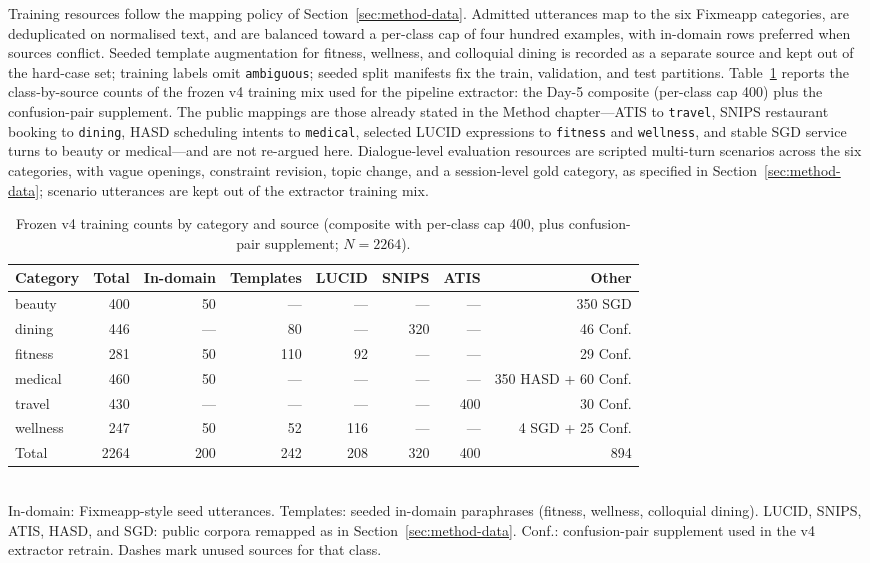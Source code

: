 Training resources follow the mapping policy of Section~\ref{sec:method-data}.
Admitted utterances map to the six Fixmeapp categories, are deduplicated on normalised text, and are balanced toward a per-class cap of four hundred examples, with in-domain rows preferred when sources conflict.
Seeded template augmentation for fitness, wellness, and colloquial dining is recorded as a separate source and kept out of the hard-case set; training labels omit \texttt{ambiguous}; seeded split manifests fix the train, validation, and test partitions.
Table~\ref{tab:construction-corpus-counts} reports the class-by-source counts of the frozen v4 training mix used for the pipeline extractor: the Day-5 composite (per-class cap 400) plus the confusion-pair supplement.
The public mappings are those already stated in the Method chapter---ATIS to \texttt{travel}, SNIPS restaurant booking to \texttt{dining}, HASD scheduling intents to \texttt{medical}, selected LUCID expressions to \texttt{fitness} and \texttt{wellness}, and stable SGD service turns to beauty or medical---and are not re-argued here.
Dialogue-level evaluation resources are scripted multi-turn scenarios across the six categories, with vague openings, constraint revision, topic change, and a session-level gold category, as specified in Section~\ref{sec:method-data}; scenario utterances are kept out of the extractor training mix.

\begin{table}[!ht]
  \centering
  \small
  \caption{Frozen v4 training counts by category and source
  (composite with per-class cap 400, plus confusion-pair supplement; $N=2264$).}
  \label{tab:construction-corpus-counts}
  \setlength{\tabcolsep}{3pt}
  \begin{tabular}{@{}lrrrrrrr@{}}
    \hline
    \textbf{Category} & \textbf{Total} & \textbf{In-domain} & \textbf{Templates} & \textbf{LUCID} & \textbf{SNIPS} & \textbf{ATIS} & \textbf{Other} \\
    \hline
    beauty & 400 & 50 & --- & --- & --- & --- & 350 SGD \\
    dining & 446 & --- & 80 & --- & 320 & --- & 46 Conf. \\
    fitness & 281 & 50 & 110 & 92 & --- & --- & 29 Conf. \\
    medical & 460 & 50 & --- & --- & --- & --- & 350 HASD + 60 Conf. \\
    travel & 430 & --- & --- & --- & --- & 400 & 30 Conf. \\
    wellness & 247 & 50 & 52 & 116 & --- & --- & 4 SGD + 25 Conf. \\
    \hline
    Total & 2264 & 200 & 242 & 208 & 320 & 400 & 894 \\
    \hline
  \end{tabular}\\[0.35em]
  {\footnotesize
  In-domain: Fixmeapp-style seed utterances.
  Templates: seeded in-domain paraphrases (fitness, wellness, colloquial dining).
  LUCID, SNIPS, ATIS, HASD, and SGD: public corpora remapped as in Section~\ref{sec:method-data}.
  Conf.: confusion-pair supplement used in the v4 extractor retrain.
  Dashes mark unused sources for that class.}
\end{table}

